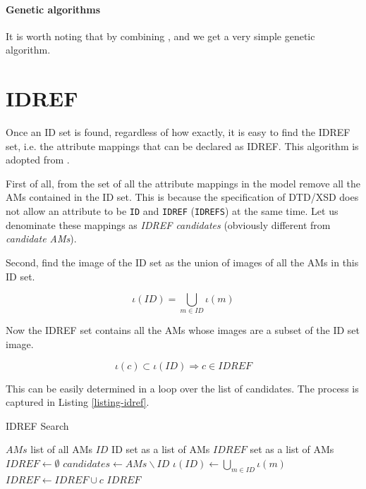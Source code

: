 \paragraph{Genetic algorithms}

It is worth noting that by combining ,  and  we get a very simple genetic algorithm.

\section{IDREF}

Once an ID set is found, regardless of how exactly, it is easy to find the IDREF set, i.e. the attribute mappings that can be declared as IDREF. This algorithm is adopted from \cite{fidax}.

First of all, from the set of all the attribute mappings in the model remove all the AMs contained in the ID set. This is because the specification of DTD/XSD does not allow an attribute to be \texttt{ID} and \texttt{IDREF} (\texttt{IDREFS}) at the same time. Let us denominate these mappings as \textit{IDREF candidates} (obviously different from \textit{candidate AMs}).

Second, find the image of the ID set as the union of images of all the AMs in this ID set.

\[\iota(ID) = \bigcup_{m \in ID} \iota(m)\]

Now the IDREF set contains all the AMs whose images are a subset of the ID set image.

\[\iota(c) \subset \iota(ID) \Rightarrow c \in IDREF\]

This can be easily determined in a loop over the list of candidates. The process is captured in Listing \ref{listing-idref}.

\begin{algorithm}
\caption{IDREF Search}
\label{listing-idref}
\begin{algorithmic}
\REQUIRE $AMs$ list of all AMs
\REQUIRE $ID$ ID set as a list of AMs
\ENSURE $IDREF$ set as a list of AMs
\STATE $IDREF \gets \emptyset$
\STATE $candidates \gets AMs \backslash ID$
\STATE $\iota(ID) \gets \bigcup_{m \in ID} \iota(m)$
    \STATE $IDREF \gets IDREF \cup c$
  \ENDIF
\ENDFOR
\RETURN $IDREF$
\end{algorithmic}
\end{algorithm}
